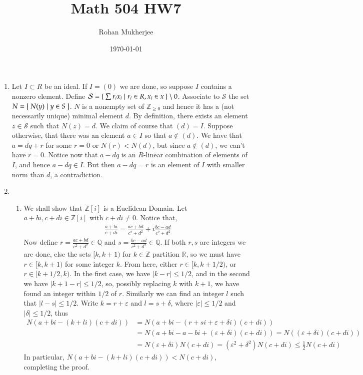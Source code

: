 \documentclass[12pt]{article}
\title{Math 504 HW7}
\date{\today}
\author{Rohan Mukherjee}
\theoremstyle{definitionstyle}
\def\mbb#1{\mathbb{#1}}
\def \R{\mbb{R}}
\def \ve{\varepsilon}
\newcommand{\Z}{\mbb Z}
\begin{document}
	\maketitle
	\begin{enumerate}[leftmargin=\labelsep]
		\item Let $I \subset R$ be an ideal. If $I = (0)$ we are done, so suppose $I$ contains a nonzero element. Define $\mathcal S = \Set{\sum r_i x_i \mid r_i \in R, x_i \in x} \setminus 0$. Associate to $\mathcal S$ the set $N = \Set{N(y) \mid y \in S}$. $N$ is a nonempty set of $\Z_{\geq 0}$ and hence it has a (not necessarily unique) minimal element $d$. By definition, there exists an element $z \in \mathcal S$ such that $N(z) = d$. We claim of course that $(d) = I$. Suppose otherwise, that there was an element $a \in I$ so that $a \not \in (d)$. We have that $a = dq + r$ for some $r = 0$ or $N(r) < N(d)$, but since $a \not \in (d)$, we can't have $r = 0$. Notice now that $a - dq$ is an $R$-linear combination of elements of $I$, and hence $a-dq \in I$. But then $a-dq = r$ is an element of $I$ with smaller norm than $d$, a contradiction. 
		
		\item 
		\begin{enumerate}
			\item We shall show that $\Z[i]$ is a Euclidean Domain. Let $a+bi, c+di \in \Z[i]$ with $c+di \neq 0$. Notice that,
			\begin{align*}
				\frac{a+bi}{c+di} = \frac{ac+bd}{c^2+d^2} + i\frac{bc-ad}{c^2+d^2}
			\end{align*}
			Now define $r = \frac{ac+bd}{c^2+d^2} \in \mbb Q$ and $s = \frac{bc-ad}{c^2+d^2} \in \mbb Q$. If both $r,s$ are integers we are done, else the sets $[k, k+1)$ for $k \in \Z$ partition $\R$, so we must have $r \in [k, k+1)$ for some integer $k$. From here, either $r \in [k, k+1/2)$, or $r \in [k+1/2, k)$. In the first case, we have $|k-r| \leq 1/2$, and in the second we have $|k+1-r| \leq 1/2$, so, possibly replacing $k$ with $k+1$, we have found an integer within $1/2$ of $r$. Similarly we can find an integer $l$ such that $|l-s| \leq 1/2$. Write $k = r + \ve$ and $l = s + \delta$, where $|\ve| \leq 1/2$ and $|\delta| \leq 1/2$, thus
			\begin{align*}
				N(a+bi-(k+li)(c+di)) &= N(a+bi - (r+si + \ve + \delta i)(c+di)) 
				\\&= N(a+bi - a - bi + (\ve+\delta i)(c+di)) = N((\ve+\delta i)(c+di)) \\
				&= N(\ve+\delta i)N(c+di) = (\ve^2+\delta^2)N(c+di) \leq \frac12N(c+di)
			\end{align*}
			In particular, $N(a+bi-(k+li)(c+di)) < N(c+di)$, completing the proof.
			

\end{enumerate}
\end{enumerate}
\end{document}
